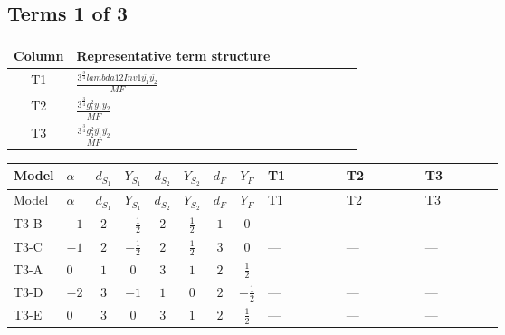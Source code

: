 \documentclass[8pt]{article}
\begin{document}
\begin{landscape}
\subsection*{Terms 1 of 3}
\begin{center}
\begin{tabular}{@{}c >{\raggedright\arraybackslash}p{0.82\linewidth}@{}}
\toprule
Column & Representative term structure \\
\midrule
T1 & \(\displaystyle \frac{3^{\frac{3}{4}} lambda12Inv1 \overline{y_{1}} \overline{y_{2}}}{MF}\) \\
\midrule
T2 & \(\displaystyle \frac{3^{\frac{3}{4}} g_{1}^{2} \overline{y_{1}} \overline{y_{2}}}{MF}\) \\
\midrule
T3 & \(\displaystyle \frac{3^{\frac{3}{4}} g_{2}^{2} \overline{y_{1}} \overline{y_{2}}}{MF}\) \\
\midrule
\bottomrule
\end{tabular}
\end{center}
\smallskip
\tiny
\begin{longtable}{@{}llcccccc >{\raggedright\arraybackslash}p{0.21\linewidth} >{\raggedright\arraybackslash}p{0.21\linewidth} >{\raggedright\arraybackslash}p{0.21\linewidth}@{}}
\toprule
Model & $\alpha$ & $d_{S_1}$ & $Y_{S_1}$ & $d_{S_2}$ & $Y_{S_2}$ & $d_F$ & $Y_F$ & T1 & T2 & T3 \\
\midrule
\endfirsthead
\toprule
Model & $\alpha$ & $d_{S_1}$ & $Y_{S_1}$ & $d_{S_2}$ & $Y_{S_2}$ & $d_F$ & $Y_F$ & T1 & T2 & T3 \\
\midrule
\endhead
T3-B & $-1$ & $2$ & $-\frac{1}{2}$ & $2$ & $\frac{1}{2}$ & $1$ & $0$ & --- & --- & --- \\
\midrule
T3-C & $-1$ & $2$ & $-\frac{1}{2}$ & $2$ & $\frac{1}{2}$ & $3$ & $0$ & --- & --- & --- \\
\midrule
T3-A & $0$ & $1$ & $0$ & $3$ & $1$ & $2$ & $\frac{1}{2}$ & \scriptsize\adjustbox{max width=\linewidth}{$\begin{gathered} \frac{3^{\frac{3}{4}} lambda12Inv1 \overline{y_{1}} \overline{y_{2}}}{6 MF}\end{gathered}$} & \scriptsize\adjustbox{max width=\linewidth}{$\begin{gathered} \frac{3^{\frac{3}{4}} g_{1}^{2} \overline{y_{1}} \overline{y_{2}}}{8 MF}\end{gathered}$} & \scriptsize\adjustbox{max width=\linewidth}{$\begin{gathered} \frac{11 \cdot 3^{\frac{3}{4}} g_{2}^{2} \overline{y_{1}} \overline{y_{2}}}{8 MF}\end{gathered}$} \\
\midrule
T3-D & $-2$ & $3$ & $-1$ & $1$ & $0$ & $2$ & $-\frac{1}{2}$ & --- & --- & --- \\
\midrule
T3-E & $0$ & $3$ & $0$ & $3$ & $1$ & $2$ & $\frac{1}{2}$ & --- & --- & --- \\
\midrule
\bottomrule
\end{longtable}
\clearpage

\end{landscape}
\end{document}
